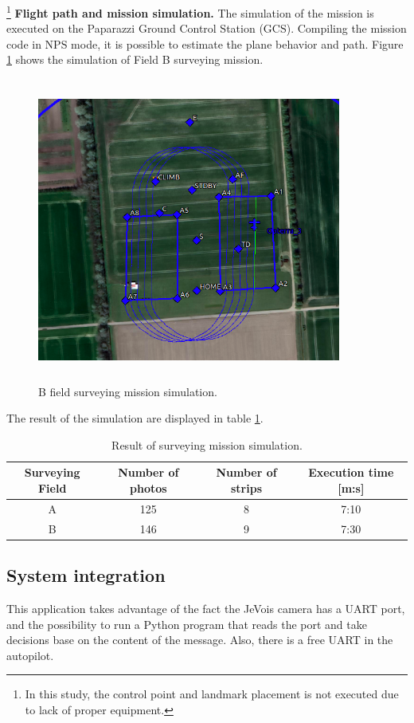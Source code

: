 \footnote{In this study, the control point and landmark placement is not executed due to lack of proper equipment.} 
\textbf{Flight path and mission simulation.}\newline
The simulation of the mission is executed on the Paparazzi Ground Control Station (GCS). Compiling the mission code in NPS mode, it is possible to estimate the plane behavior and path. Figure \ref{fig:bsim} shows the simulation of Field B surveying mission.
\begin{figure}[H]
\centering
\includegraphics[width=10cm,height=10cm,keepaspectratio]{imagenes/SimBField.png}
\caption{B field surveying mission simulation.}
\label{fig:bsim}
\end{figure}
The result of the simulation are displayed in table \ref{Table:SimResult}.
\begin{table}[H]
\centering
\begin{tabular}{|c|c|c|c|}
\hline
Surveying Field & Number of photos & Number of strips & Execution time [m:s] \\ \hline
A               & 125              & 8                & 7:10           \\ \hline
B               & 146              & 9                & 7:30           \\ \hline
\end{tabular}
\caption{Result of surveying mission simulation.}
\label{Table:SimResult}
\end{table}
\subsection{System integration}
This application takes advantage of the fact the JeVois camera has a UART port, and the possibility to run a Python program that reads the port and take decisions base on the content of the message. Also, there is a free UART in the autopilot.

